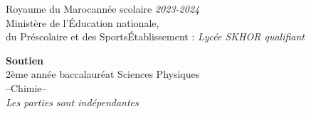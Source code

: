 \documentclass[12pt]{article}
\newcommand\headerMe[2]{\noindent{}#1\hfill#2}
\begin{document}
\headerMe{Royaume du Maroc}{année scolaire \emph{2023-2024}}\\
\headerMe{Ministère de l'Éducation nationale, }{  }\\
\headerMe{du Préscolaire et des Sports}{Établissement : \emph{Lycée SKHOR qualifiant}}\\
\vspace{-1cm}
\begin{center}
  \textbf{Soutien}\\
    2ème année baccalauréat Sciences Physiques\\
\hrulefill
  \Large{--Chimie--}
\hrulefill\\

    \emph{Les  parties sont indépendantes}

    \vspace{-.2cm}
\end{center}
\end{document}
